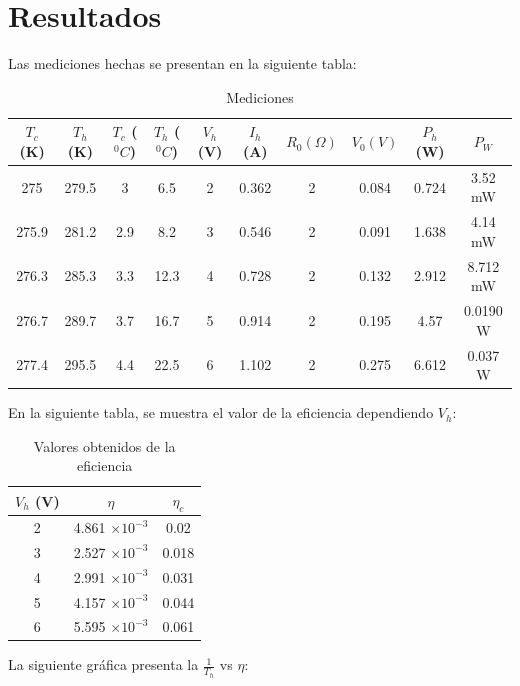 \documentclass[12pt]{article}
\begin{document}
\section{Resultados}
Las mediciones hechas se presentan en la siguiente tabla:

	\begin{table}[H]
		\centering
		\begin{tabular}{|cccccccccc|}
			\hline
			$T_c$ (K)&$T_h$ (K)&$T_c$ ($^0C$)&$T_h$ ($^0C$) & $V_h$ (V) & $I_h$ (A) &$R_0 (\Omega)$ & $V_0 (V)$ & $P_h$ (W) & $P_W$ \\ \hline
			275&  279.5& 3& 6.5&  2 & 0.362& 2 &0.084 &0.724 & 3.52 mW\\ \hline
			275.9 &281.2 &2.9 &8.2 & 3& 0.546& 2& 0.091& 1.638& 4.14 mW\\ \hline
			276.3 &285.3 &3.3 &12.3 &4 & 0.728 &2 &0.132 & 2.912& 8.712 mW\\ \hline
			276.7 &289.7 &3.7 &16.7 &5 & 0.914 &2 &0.195 &4.57 & 0.0190 W \\ \hline
			277.4 &295.5 &4.4 &22.5 &6 & 1.102 &2 &0.275 & 6.612 & 0.037 W\\ \hline
		\end{tabular}
		\caption{Mediciones}
		\label{tab:traIso}
	\end{table}

En la siguiente tabla, se muestra el valor de la eficiencia dependiendo $V_h$:
\begin{table}[H]
\centering
\begin{tabular}{|ccc|}
\hline
$V_h$ (V)& $\eta$ & $\eta_c$ \\ \hline
2& 4.861 $ \times 10 ^{-3}$ & 0.02 \\ \hline
3&2.527 $ \times 10 ^{-3}$ & 0.018\\ \hline
4& 2.991 $ \times 10 ^{-3}$& 0.031\\ \hline
5& 4.157 $ \times 10 ^{-3}$& 0.044 \\ \hline
6& 5.595 $ \times 10 ^{-3}$& 0.061 \\ \hline
\end{tabular}
\caption{Valores obtenidos de la eficiencia}
\label{tab:taIso}
\end{table}

La siguiente gráfica presenta la $\frac{1}{T_h}$ vs $\eta$:
\end{document}

